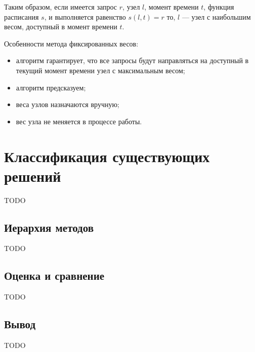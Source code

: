 Таким образом, если имеется запрос $r$, узел $l$, момент времени $t$, функция расписания $s$, и выполняется равенство $s(l, t) = r$ то, $l$ --- узел с наибольшим весом, доступный в момент времени $t$.

Особенности метода фиксированных весов:
\begin{itemize}
    \item алгоритм гарантирует, что все запросы будут направляться на доступный в текущий момент времени узел с максимальным весом;
    \item алгоритм предсказуем;
    \item веса узлов назначаются вручную;
    \item вес узла не меняется в процессе работы.
\end{itemize}

\section{Классификация существующих решений}

TODO

\subsection{Иерархия методов}

TODO

\subsection{Оценка и сравнение}

TODO

\subsection{Вывод}

TODO

